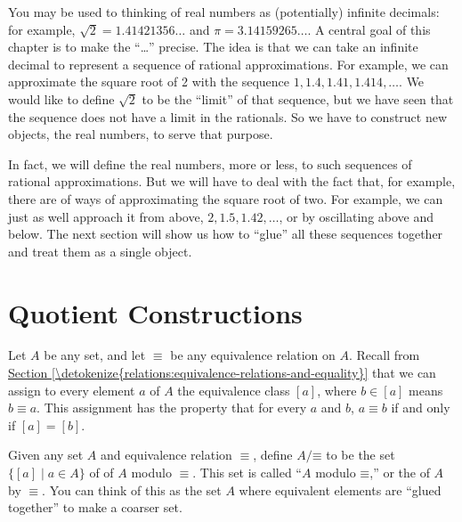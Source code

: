 \documentclass[letterpaper,10pt,english]{sphinxmanual}
\begin{document}
\sphinxAtStartPar
You may be used to thinking of real numbers as (potentially) infinite decimals: for example, \(\sqrt{2} = 1.41421356\ldots\) and \(\pi = 3.14159265\ldots\). A central goal of this chapter is to make the “…” precise. The idea is that we can take an infinite decimal to represent a sequence of rational approximations. For example, we can approximate the square root of 2 with the sequence \(1, 1.4, 1.41, 1.414, \ldots\). We would like to define \(\sqrt{2}\) to be the “limit” of that sequence, but we have seen that the sequence does not have a limit in the rationals. So we have to construct new objects, the real numbers, to serve that purpose.

\sphinxAtStartPar
In fact, we will define the real numbers, more or less, to  such sequences of rational approximations. But we will have to deal with the fact that, for example, there are  of ways of approximating the square root of two. For example, we can just as well approach it from above, \(2, 1.5, 1.42, \ldots\), or by oscillating above and below. The next section will show us how to “glue” all these sequences together and treat them as a single object.


\section{Quotient Constructions}
\label{\detokenize{the_real_numbers:quotient-constructions}}\label{\detokenize{the_real_numbers:id2}}
\sphinxAtStartPar
Let \(A\) be any set, and let \(\equiv\) be any equivalence relation on \(A\). Recall from \hyperref[\detokenize{relations:equivalence-relations-and-equality}]{Section \ref{\detokenize{relations:equivalence-relations-and-equality}}} that we can assign to every element \(a\) of \(A\) the equivalence class \([a]\), where \(b \in [a]\) means \(b \equiv a\). This assignment has the property that for every \(a\) and \(b\), \(a \equiv b\) if and only if \([a] = [b]\).

\sphinxAtStartPar
Given any set \(A\) and equivalence relation \(\equiv\), define \(A / \mathord{\equiv}\) to be the set \(\{ [ a ] \mid a \in A \}\) of  of \(A\) modulo \(\equiv\). This set is called “\(A\) modulo \(\mathord{\equiv}\),” or the  of \(A\) by \(\equiv\). You can think of this as the set \(A\) where equivalent elements are “glued together” to make a coarser set.
\end{document}
